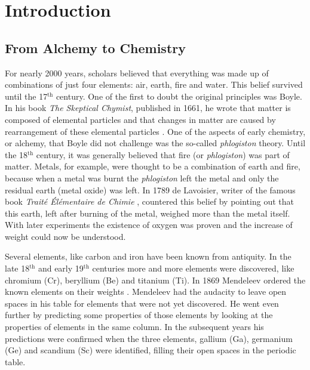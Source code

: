 \chapter{Introduction}
\label{chap_intro}

\newpage

\section{From Alchemy to Chemistry}

For nearly 2000 years, scholars believed that everything was made up of combinations of just four elements: air, earth, fire and water. This belief survived until the 17$^\mathrm{th}$ century. One of the first to doubt the original principles was Boyle. In his book \textit{The Skeptical Chymist}, published in 1661, he wrote that matter is composed of elemental particles and that changes in matter are caused by rearrangement of these elemental particles \cite{boyle}. One of the aspects of early chemistry, or alchemy, that Boyle did not challenge was the so-called \textit{phlogiston} theory. Until the 18$^\mathrm{th}$ century, it was generally believed that fire (or \textit{phlogiston}) was part of matter. Metals, for example, were thought to be a combination of earth and fire, because when a metal was burnt the \textit{phlogiston} left the metal and only the residual earth (metal oxide) was left. In 1789 de Lavoisier, writer of the famous book \textit{Trait\'e \'El\'ementaire de Chimie} \cite{lavoisier}, countered this belief by pointing out that this earth, left after burning of the metal, weighed more than the metal itself. With later experiments the existence of oxygen was proven and the increase of weight could now be understood.

Several elements, like carbon and iron have been known from antiquity. In the late 18$^\mathrm{th}$ and early 19$^\mathrm{th}$ centuries more and more elements were discovered, like chromium (Cr), beryllium (Be) and titanium (Ti).  In 1869 Mendeleev ordered the known elements on their weights \cite{mendeleev}. Mendeleev had the audacity to leave open spaces in his table for elements that were not yet discovered. He went even further by predicting some properties of those elements by looking at the properties of elements in the same column. In the subsequent years his predictions were confirmed when the three elements, gallium (Ga), germanium (Ge) and scandium (Sc) were identified, filling their open spaces in the periodic table.

